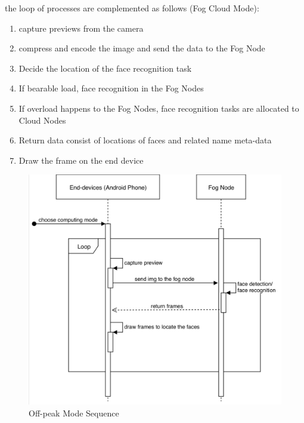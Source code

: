 the loop of processes are complemented as follows (Fog Cloud Mode):
\begin{enumerate}
    \item capture previews from the camera
    \item compress and encode the image and send the data to the Fog Node
    \item Decide the location of the face recognition task
    \item If bearable load, face recognition in the Fog Nodes
    \item If overload happens to the Fog Nodes, face recognition tasks are allocated to Cloud Nodes
    \item Return data consist of locations of faces and related name meta-data
    \item Draw the frame on the end device
\end{enumerate}

\begin{figure}
    \centering
    \includegraphics[width=\textwidth]{images/fog_mode.png}
    \caption{Off-peak Mode Sequence}
    \label{fig:off-peak_mode_sequence}
\end{figure}

